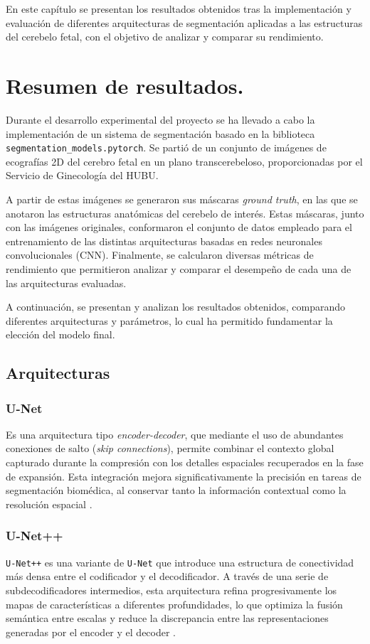 
En este capítulo se presentan los resultados obtenidos tras la implementación y evaluación de diferentes arquitecturas de segmentación aplicadas a las estructuras del cerebelo fetal, con el objetivo de analizar y comparar su rendimiento.

\section{Resumen de resultados.}
Durante el desarrollo experimental del proyecto se ha llevado a cabo la implementación de un sistema de segmentación basado en la biblioteca \texttt{segmentation\_models.pytorch}. Se partió de un conjunto de imágenes de ecografías 2D del cerebro fetal en un plano transcerebeloso, proporcionadas por el Servicio de Ginecología del HUBU. 

A partir de estas imágenes se generaron sus máscaras \textit{ground truth}, en las que se anotaron las estructuras anatómicas del cerebelo de interés. Estas máscaras, junto con las imágenes originales, conformaron el conjunto de datos empleado para el entrenamiento de las distintas arquitecturas basadas en redes neuronales convolucionales (CNN). Finalmente, se calcularon diversas métricas de rendimiento que permitieron analizar y comparar el desempeño de cada una de las arquitecturas evaluadas. 

A continuación, se presentan y analizan los resultados obtenidos, comparando diferentes arquitecturas y parámetros, lo cual ha permitido fundamentar la elección del modelo final.

\subsection{Arquitecturas}
\subsubsection{U-Net}
Es una arquitectura tipo \textit{encoder-decoder}, que mediante el uso de abundantes conexiones de salto (\textit{skip connections}), permite combinar el contexto global capturado durante la compresión con los detalles espaciales recuperados en la fase de expansión. Esta integración mejora significativamente la precisión en tareas de segmentación biomédica, al conservar tanto la información contextual como la resolución espacial \cite{unet2015}.
\subsubsection{U-Net++}
\texttt{U-Net++} es una variante de \texttt{U-Net} que introduce una estructura de conectividad más densa entre el codificador y el decodificador. A través de una serie de subdecodificadores intermedios, esta arquitectura refina progresivamente los mapas de características a diferentes profundidades, lo que optimiza la fusión semántica entre escalas y reduce la discrepancia entre las representaciones generadas por el encoder y el decoder \cite{unetplusplus2018}.
